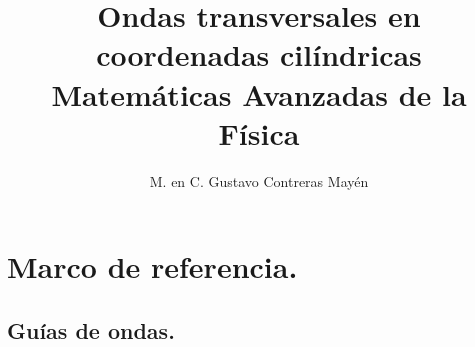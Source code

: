 
\title{Ondas transversales en coordenadas cilíndricas \\[0.3em]  \large{Matemáticas Avanzadas de la Física}\vspace{-3ex}}
\author{M. en C. Gustavo Contreras Mayén}
\date{ }


\vspace{-4cm}
\maketitle
\fontsize{14}{14}\selectfont
\tableofcontents
\newpage

\section{Marco de referencia.}

\subsection{Guías de ondas.}

